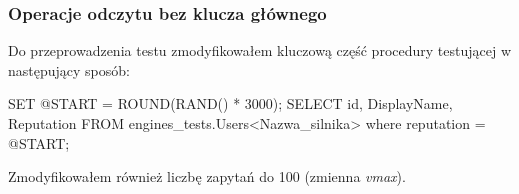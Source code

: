 \subsubsection{Operacje odczytu bez klucza głównego}
Do przeprowadzenia testu zmodyfikowałem kluczową część procedury testującej w następujący sposób:
\begin{spverbatim}
	SET @START = ROUND(RAND() * 3000);
	SELECT id, DisplayName, Reputation FROM engines_tests.Users<Nazwa_silnika> where reputation = @START;
\end{spverbatim}
Zmodyfikowałem również liczbę zapytań do 100 (zmienna \textit{v\textunderscore max}).
